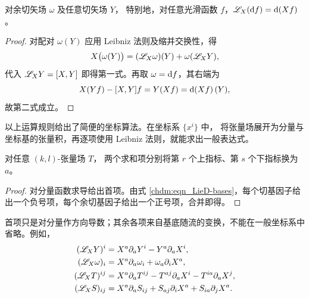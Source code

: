 \begin{proposition}
    对余切矢场 $\omega$ 及任意切矢场 $Y$，
    特别地，对任意光滑函数 $f$，$\mathscr{L}_X(\dd f)=\dd(Xf)$。
\end{proposition}
\begin{proof}
    对配对 $\omega(Y)$ 应用 Leibniz 法则及缩并交换性，得
    \[
        X\bigl(\omega(Y)\bigr)=(\mathscr{L}_X\omega)(Y)+\omega(\mathscr{L}_XY),
    \]
    代入 $\mathscr{L}_XY=[X,Y]$ 即得第一式。再取 $\omega=\dd f$，其右端为
    \[
        X(Yf)-[X,Y]f=Y(Xf)=\dd(Xf)(Y),
    \]
    故第二式成立。
\end{proof}

以上运算规则给出了简便的坐标算法。在坐标系 $\{x^i\}$ 中，
将张量场展开为分量与坐标基的张量积，再逐项使用 Leibniz 法则，就能求出一般表达式。

\begin{theorem}
    对任意 $(k,l)$-张量场 $T$，
    两个求和项分别将第 $r$ 个上指标、第 $s$ 个下指标换为 $a$。
\end{theorem}
\begin{proof}
    对分量函数求导给出首项。由式 \eqref{chdm:eqn_LieD-bases}，每个切基因子给出一个负号项，每个余切基因子给出一个正号项，合并即得。
\end{proof}

首项只是对分量作方向导数；其余各项来自基底随流的变换，不能在一般坐标系中省略。例如，
\[
\begin{aligned}
    (\mathscr{L}_XY)^i&=X^a\partial_aY^i-Y^a\partial_aX^i,\\
    (\mathscr{L}_X\omega)_i&=X^a\partial_a\omega_i+\omega_a\partial_iX^a,\\
    (\mathscr{L}_XT)^{ij}&=X^a\partial_aT^{ij}-T^{aj}\partial_aX^i-T^{ia}\partial_aX^j,\\
    (\mathscr{L}_XS)_{ij}&=X^a\partial_aS_{ij}+S_{aj}\partial_iX^a+S_{ia}\partial_jX^a.
\end{aligned}
\]

